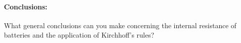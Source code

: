 \begin{multicols}{2}
\paragraph {Conclusions:}  What general conclusions can you make concerning the internal resistance of batteries and the application of Kirchhoff's rules?

\end{multicols}
